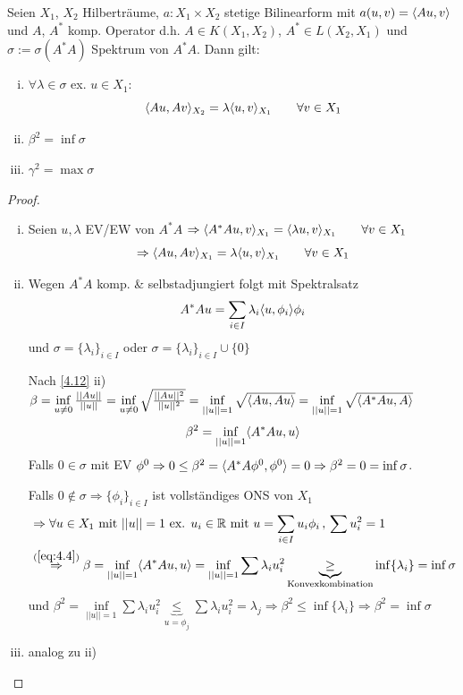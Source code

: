 \begin{satz} \label{4.13}
Seien $X_1$, $X_2$ Hilberträume, $a: X_1 \times X_2$ stetige Bilinearform mit $a(u,v) = \langle Au, v \rangle$ und $A$, $A^*$ komp. Operator d.h. $A \in K(X_1,X_2)$, $A^* \in L(X_2,X_1)$ und $\sigma := \sigma(A^*A)$ Spektrum von $A^*A$. Dann gilt:
\begin{enumerate}[i)]
	\item $\forall \lambda \in \sigma$ ex. $u \in X_1$:
	\[
		\langle Au, Av \rangle_{X_2} = \lambda \langle u, v \rangle_{X_1} \qquad \forall v \in X_1
	\]
	\item $\beta^2 = \inf \sigma$
	\item $\gamma^2 = \max \sigma$
\end{enumerate}
\begin{proof}
\begin{enumerate}[i)]
\item Seien $u, \lambda$ EV/EW von $A^*A$ $\Rightarrow \langle A^*Au, v \rangle_{X_1} = \langle \lambda u, v \rangle_{X_1} \qquad \forall v \in X_1$
\[
	\Rightarrow \langle Au, Av \rangle_{X_1} = \lambda \langle u, v \rangle_{X_1} \qquad \forall v \in X_1
\]
\item Wegen $A^*A$ komp. \& selbstadjungiert folgt mit Spektralsatz
\[
	A^*Au = \sum\limits_{i \in I} \lambda_i \dotp{u}{\phi_i}\phi_i
\]
und $\sigma = \{\lambda_i\}_{i \in I}$ oder $\sigma = \{\lambda_i\}_{i \in I} \cup \{0\}$

Nach \ref{4.12} ii) $\beta = \inf\limits_{u \neq 0} \frac{||Au||}{||u||} = \inf\limits_{u \neq 0} \sqrt{\frac{||Au||^2}{||u||^2}} = \inf\limits_{||u|| = 1} \sqrt{\langle Au, Au \rangle} = \inf\limits_{||u||=1} \sqrt{\langle A^*Au, A \rangle}$
\begin{align} \label{eq:4.4}
\beta^2 = \inf\limits_{||u||=1} \langle A^*Au, u \rangle
\end{align}
Falls $0 \in \sigma$ mit EV $\phi^0 \Rightarrow 0 \leq \beta^2 = \dotp{A^*A\phi^0}{\phi^0} = 0 \Rightarrow \beta^2 = 0 = \inf \sigma$.

Falls $0 \not\in \sigma \Rightarrow \{\phi_i\}_{i \in I}$ ist vollständiges ONS von $X_1$
\begin{align*}
	&\Rightarrow \forall u \in X_1 \text{ mit } ||u||=1 \text{ ex. } u_i \in \R \text{ mit } u = \sum\limits_{i \in I} u_i \phi_i \, , \, \sum u_i^2 = 1 \\
	&\overset{(\ref{eq:4.4})}{\Rightarrow} \beta = \inf\limits_{||u||=1} \dotp{A^*Au}{u} = \inf\limits_{||u||=1} \sum \lambda_i u_i^2  \underbrace{\geq}_{\text{Konvexkombination}} \inf \{\lambda_i\} = \inf \sigma
\end{align*}
und $\beta^2 = \inf\limits_{||u||=1} \sum \lambda_i u_i^2 \underbrace{\leq}_{u = \phi_j} \sum \lambda_i u_i^2 = \lambda_j \Rightarrow \beta^2 \leq \inf \{\lambda_i\} \Rightarrow \beta^2 = \inf \sigma$
\item analog zu ii)
\end{enumerate}
\end{proof}
\end{satz}


